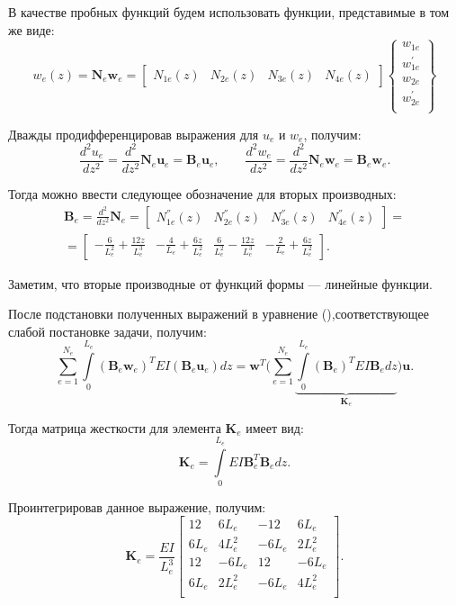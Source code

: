 \documentclass[12pt,a4paper]{article}
\begin{document}
В качестве пробных функций будем использовать функции, представимые в том же виде: 
$$w_e(z)=\textbf{N}_e \textbf{w}_{e}=
\left[
  \begin{array}{cccc}
     N_{1e}(z) & N_{2e}(z) & N_{3e}(z) & N_{4e}(z)
  \end{array}
\right]
\left\{
  \begin{array}{ccc}
    w_{1e}   \\
     w^{'}_{1e}  \\
		w_{2e}\\
		w^{'}_{2e}\\
  \end{array}
\right\}$$

Дважды продифференцировав выражения для $u_e$ и $w_e$, получим:
\[
\frac{d^{2}u_e}{dz^{2}}=\frac{d^{2}}{dz^{2}}\textbf{N}_e \textbf{u}_e=\textbf{B}_e \textbf{u}_e, \qquad
\frac{d^{2}w_e}{dz^{2}}=\frac{d^{2}}{dz^{2}}\textbf{N}_e \textbf{w}_e=\textbf{B}_e \textbf{w}_e.
\]


Тогда можно ввести следующее обозначение для вторых производных:
\begin{multline*}
\textbf{B}_e=\frac{d^{2}}{dz^{2}}\textbf{N}_e=
\left[
  \begin{array}{cccc}
     N_{1e}^{''}(z) & N_{2e}^{''}(z) & N_{3e}^{''}(z) & N_{4e}^{''}(z)
  \end{array}
\right]= {}\\
{}=\begin{bmatrix}
     \displaystyle-\frac{6}{L_e^{2}}+\frac{12z}{L_e^{3}} &  \displaystyle-\frac{4}{L_e}+\frac{6z}{L_e^{2}} &   \displaystyle\frac{6}{L_e^{2}}-\frac{12z}{L_e^{3}} &  \displaystyle-\frac{2}{L_e}+\frac{6z}{L_e^{2}}
\end{bmatrix}.
\end{multline*}

Заметим, что вторые производные от функций формы --- линейные функции. 

После подстановки полученных выражений в уравнение (),соответствующее слабой постановке задачи, получим:
$$\sum\limits_{e=1}^{N_{e}}\int\limits_{0}^{L_e}(\textbf{B}_e\textbf{w}_e)^{T}EI(\textbf{B}_e\textbf{u}_e)dz=\textbf{w}^{T}\biggl(\sum\limits_{e=1}^{N_e}\underbrace{\int\limits_{0}^{L_e}(\textbf{B}_e)^{T}EI\textbf{B}_e dz}_{\textbf{K}_e}\biggr)\textbf{u}.$$
		
Тогда матрица жесткости для элемента $\textbf{K}_e$ имеет вид:
$$\textbf{K}_e=\int\limits_{0}^{L_e}EI\textbf{B}_e^{T}\textbf{B}_e dz.$$

Проинтегрировав данное выражение, получим:
$$\textbf{K}_e=\frac{EI}{L_e^{3}}
\left[
  \begin{array}{cccc}
    12 & 6L_e & -12 & 6L_e\\
    6L_e & 4L_e^{2} & -6L_e & 2L_e^{2}\\
		12 & -6L_e & 12 & -6L_e\\
		6L_e & 2L_e^{2} & -6L_e & 4L_e^{2}\\
  \end{array}
\right].
$$
\end{document}
